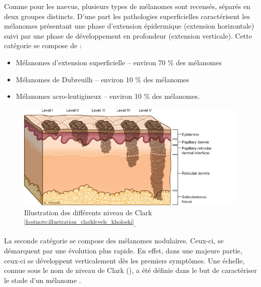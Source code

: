 Comme pour les naevus, plusieurs types de mélanomes sont recensés, séparés en deux groupes distincts. D’une part les pathologies superficielles caractérisent les mélanomes présentant une phase d’extension épidermique (extension horizontale) suivi par une phase de développement en profondeur (extension verticale). Cette catégorie se compose de :
\begin{itemize}
\item Mélanomes d'extension superficielle – environ 70 \% des mélanomes
\item Mélanomes de Dubreuilh – environ 10 \% des mélanomes \cite{LeGal2011}
\item Mélanomes acro-lentigineux – environ 10 \% des mélanomes.
\end{itemize}
\begin{figure}[H]
    \centering
    \includegraphics[width=0.7\linewidth]{contents/chapter_1/resources/illustration_clarklevels_kholoski.png}
    \caption{Illustration des différents niveau de Clark \cite{Clark1969} \textsuperscript{\ref{footnote:illustration_clarklevels_kholoski}}.}
    \label{fig:illustration_clarklevels_kholoski}
\end{figure}\par
\addtocounter{footnote}{1}
La seconde catégorie se compose des mélanomes nodulaires. Ceux-ci, se démarquent par une évolution plus rapide. En effet, dans une majeure partie, ceux-ci se développent verticalement dès les premiers symptômes. Une échelle, connue sous le nom de niveau de Clark (), a été définie dans le but de caractériser le stade d’un mélanome \cite{Clark1969}.\par

